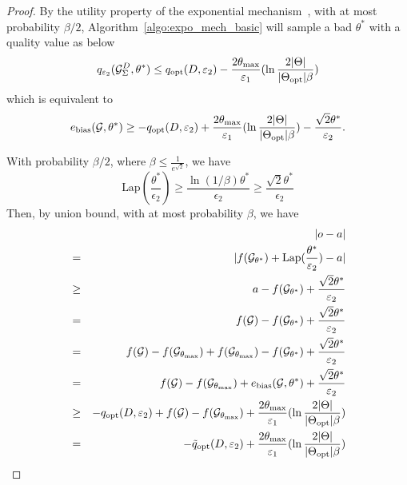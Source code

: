 \begin{proof}
By the utility property of the exponential mechanism~\cite{mcsherry2007mechanism}, with at most probability $\beta/2$, Algorithm~\ref{algo:expo_mech_basic} will sample a bad $\theta^*$ with a  quality value as below
\begin{equation}
    q_{\varepsilon_2}({\mathcal{G}_{{\Sigma}}^{D}},\theta^*) \leq q_{\normalfont{\text{opt}}}(D,\varepsilon_2) - \frac{2 \theta_{\max}}{\varepsilon_1} (\ln \frac{2|\Theta|}{|\Theta_{\normalfont{\text{opt}}}|\beta})
\end{equation}
which is equivalent to 
\begin{equation}\label{eq:goodtheta}
    e_{\text{bias}}(\mathcal{G},\theta^*)  \geq -q_{\normalfont{\text{opt}}}(D,\varepsilon_2) + \frac{2 \theta_{\max}}{\varepsilon_1} (\ln \frac{2|\Theta|}{|\Theta_{\normalfont{\text{opt}}}|\beta}) -  \frac{\sqrt{2}\theta^*}{\varepsilon_2}.
\end{equation}

With probability $\beta/2$, where $\beta\leq \frac{1}{e^{\sqrt{2}}}$,
we have 
\begin{equation}    
\text{Lap}(\frac{\theta^*}{\epsilon_2}) \geq
      \frac{\ln(1/\beta)\theta^{*}}{\epsilon_2} \geq \frac{\sqrt{2}\theta^*}{\epsilon_2}
      \end{equation}
Then, by union bound, with at most probability $\beta$, we have 
\begin{eqnarray}
   && |o-a| \nonumber\\
       &=& 
|f(\mathcal{G}_{\theta^*})+\text{Lap}(\frac{\theta^*}{\varepsilon_2})-a|
            \nonumber  \\
    &\geq& a- f(\mathcal{G}_{\theta^*})+ \frac{\sqrt{2}\theta^*}{\varepsilon_2}
 \nonumber \\
    &=& f(\mathcal{G})-f(\mathcal{G}_{\theta^*})+
     \frac{\sqrt{2}\theta^*}{\varepsilon_2} \nonumber \\
    &=& f(\mathcal{G})-f(\mathcal{G}_{\theta_{\max}}) +
f(\mathcal{G}_{\theta_{\max}}) - f(\mathcal{G}_{\theta^*})
 +    \frac{\sqrt{2}\theta^*}{\varepsilon_2} \nonumber\\    
    &=& f(\mathcal{G})-f(\mathcal{G}_{\theta_{\max}}) +
        e_{\text{bias}}(\mathcal{G},\theta^*)  + \frac{\sqrt{2}\theta^*}{\varepsilon_2} \nonumber\\
     &\geq& -q_{\normalfont{\text{opt}}}(D,\varepsilon_2) + f(\mathcal{G})-f(\mathcal{G}_{\theta_{\max}}) + \frac{2 \theta_{\max}}{\varepsilon_1} (\ln \frac{2|\Theta|}{|\Theta_{\normalfont{\text{opt}}}|\beta})  \nonumber \\
      &=& -\tilde{q}_{\normalfont{\text{opt}}}(D,\varepsilon_2) + \frac{2 \theta_{\max}}{\varepsilon_1} (\ln \frac{2|\Theta|}{|\Theta_{\normalfont{\text{opt}}}|\beta})
\end{eqnarray}

\end{proof}


